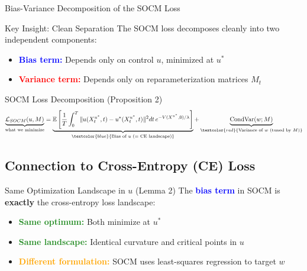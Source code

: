 \documentclass[aspectratio=169,xcolor=dvipsnames]{beamer}
\begin{document}
\begin{frame}[allowframebreaks]{Bias-Variance Decomposition of the SOCM Loss}
    
    \begin{block}{Key Insight: Clean Separation}
        The SOCM loss decomposes cleanly into two independent components:
        \begin{itemize}
            \item \textcolor{blue}{\textbf{Bias term:}} Depends only on control $u$, minimized at $u^*$
            \item \textcolor{red}{\textbf{Variance term:}} Depends only on reparameterization matrices $M_t$
        \end{itemize}
    \end{block}
    
    \vspace{0.5cm}
    
    \begin{alertblock}{SOCM Loss Decomposition (Proposition 2)}
        \begin{equation}
        \underbrace{\mathcal{L}_{SOCM}(u, M)}_{\text{what we minimize}} = \underbrace{\mathbb{E}\left[\frac{1}{T}\int_0^T \|u(X_t^{u^*}, t) - u^*(X_t^{u^*}, t)\|^2 dt \, e^{-V(X^{u^*}, 0)/\lambda}\right]}_{\textcolor{blue}{\text{Bias of } u \text{ (= CE landscape)}}} + \underbrace{\text{CondVar}(w; M)}_{\textcolor{red}{\text{Variance of } w \text{ (tuned by } M \text{)}}}
        \end{equation}
    \end{alertblock}
    
    \vspace{0.8cm}
    
    \subsection*{Connection to Cross-Entropy (CE) Loss}
    
    \begin{block}{Same Optimization Landscape in $u$ (Lemma 2)}
        The \textcolor{blue}{\textbf{bias term}} in SOCM is \textbf{exactly} the cross-entropy loss landscape:
        \begin{itemize}
            \item \textcolor{ForestGreen}{\textbf{Same optimum:}} Both minimize at $u^*$
            \item \textcolor{ForestGreen}{\textbf{Same landscape:}} Identical curvature and critical points in $u$
            \item \textcolor{orange}{\textbf{Different formulation:}} SOCM uses least-squares regression to target $w$
        \end{itemize}
    \end{block}


\end{frame}
\end{document}
